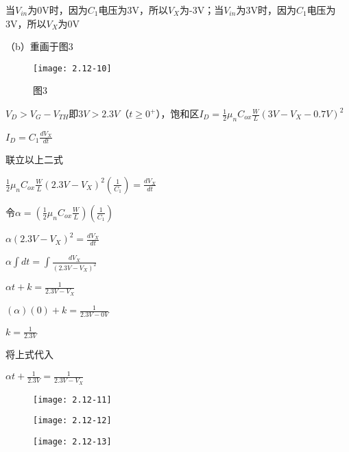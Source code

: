 \scalebox{3}{（b）}

当$V_{in}$为0V时，因为$C_1$电压为3V，所以$V_X$为-3V；当$V_{in}$为3V时，因为$C_1$电压为3V，所以$V_X$为0V

（b）重画于图3

		\begin{figure}[H] %
	\begin{minipage}{\linewidth}
		\texttt{[image: 2.12-10]}
	\end{minipage}
	\caption*{图3} %
\end{figure}

$V_{D}>V_{G}-V_{TH}$即$3V>2.3V$（$t \geqslant 0^+$），饱和区$I_D=\frac{1}{2}\mu_nC_{ox}\frac{W}{L}(3V-V_X-0.7V)^2$

$I_D=C_1\frac{dV_X}{dt}$

联立以上二式

$\frac{1}{2}\mu_nC_{ox}\frac{W}{L}(2.3V-V_X)^2(\frac{1}{C_1})=\frac{dV_X}{dt}$

令$\alpha=(\frac{1}{2}\mu_nC_{ox}\frac{W}{L})(\frac{1}{C_1})$

$\alpha (2.3V-V_X)^2=\frac{dV_X}{dt}$

$\alpha \int dt =\int \frac{dV_X}{(2.3V-V_X)^2}$

$\alpha t+k=\frac{1}{2.3V-V_X}$

$(\alpha) (0)+k=\frac{1}{2.3V-0V}$

$k=\frac{1}{2.3V}$

将上式代入

$\alpha t+\frac{1}{2.3V}=\frac{1}{2.3V-V_X}$

\begin{figure}[H] %
	\begin{minipage}{\linewidth}
		\texttt{[image: 2.12-11]}
	\end{minipage}
\end{figure}

\begin{figure}[H] %
	\begin{minipage}{\linewidth}
		\texttt{[image: 2.12-12]}
	\end{minipage}
\end{figure}

\begin{figure}[H] %
	\begin{minipage}{\linewidth}
		\texttt{[image: 2.12-13]}
	\end{minipage}
\end{figure}

